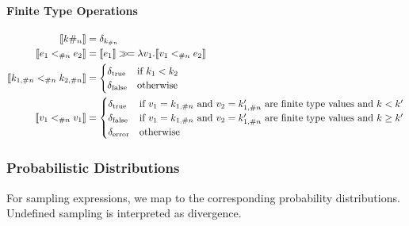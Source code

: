 \paragraph{Finite Type Operations}
\begin{align*}
\sem{ \finconst{k}{n} } &= \delta_{k_{\#n}} \\
%
\sem{ e_1 \finlt{n} e_2 } &= \sem{ e_1 } \gg\!= \lambda v_1. \sem{ v_1 \finlt{n} e_2 } \\
%
\sem{ k_{1,\#n} \finlt{n} k_{2,\#n} } &= \begin{cases}
    \delta_{\text{true}} & \text{if } k_1 < k_2 \\
    \delta_{\text{false}} & \text{otherwise}
\end{cases} \\
%
\sem{ v_1 \finlt{n} v_1 } &= \begin{cases}
	\delta_{\text{true}} & \text{if $v_1 = k_{1,\#n}$ and $v_2=k_{1,\#n}'$ are finite type values and}~k < k' \\
	\delta_{\text{false}} & \text{if $v_1 = k_{1,\#n}$ and $v_2=k_{1,\#n}'$ are finite type values and}~k \geq k' \\
	\delta_{\error} & \text{otherwise}
\end{cases}
\end{align*}

\subsubsection{Probabilistic Distributions}

For sampling expressions, we map to the corresponding probability distributions. Undefined sampling is interpreted as divergence. 

